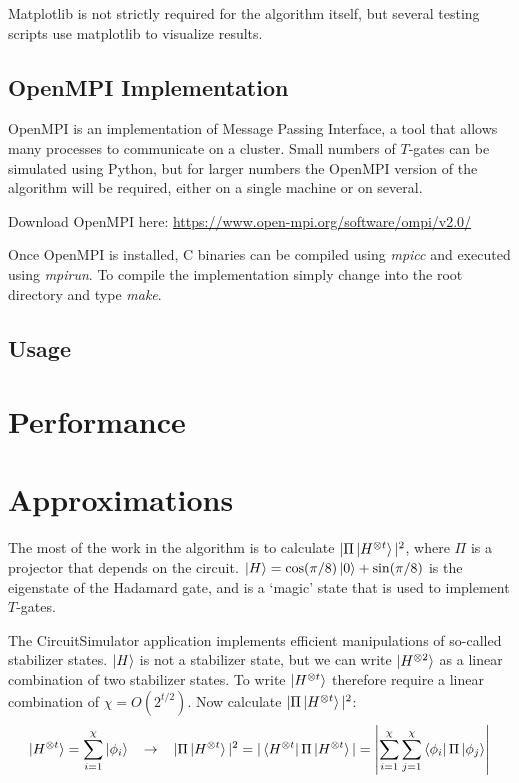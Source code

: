 \documentclass[11pt]{article}
\begin{document}
Matplotlib is not strictly required for the algorithm itself, but several testing scripts use matplotlib to visualize results.

\subsection{OpenMPI Implementation}

OpenMPI is an implementation of Message Passing Interface, a tool that allows many processes to communicate on a cluster. Small numbers of $T$-gates can be simulated using Python, but for larger numbers the OpenMPI version of the algorithm will be required, either on a single machine or on several.

Download OpenMPI here: \url{https://www.open-mpi.org/software/ompi/v2.0/}

\noindent Once OpenMPI is installed, C binaries can be compiled using \textit{mpicc} and executed using \textit{mpirun}. To compile the implementation simply change into the root directory and type \textit{make}.

\subsection{Usage}




\clearpage
\section{Performance}
\section{Approximations}

The most of the work in the algorithm is to calculate $|\Pi\ket{H^{\otimes t}}|^2$, where $\Pi$ is a projector that depends on the circuit. $\ket{H} = \cos(\pi/8)\ket{0} + \sin(\pi/8)$ is the eigenstate of the Hadamard gate, and is a `magic' state that is used to implement $T$-gates.

The CircuitSimulator application implements efficient manipulations of so-called stabilizer states. $\ket{H}$ is not a stabilizer state, but we can write $\ket{H^{\otimes 2}}$ as a linear combination of two stabilizer states. To write $\ket{H^{\otimes t}}$ therefore require a linear combination of $\chi = O(2^{t/2})$. Now calculate $|\Pi\ket{H^{\otimes t}}|^2$:
$$\ket{H^{\otimes t}} = \sum^\chi_{i=1} \ket{\phi_i} \hspace{3mm} \to \hspace{3mm} |\Pi\ket{H^{\otimes t}}|^2 = |\bra{H^{\otimes t}}\Pi\ket{H^{\otimes t}}| =\left| \sum^\chi_{i=1} \sum^\chi_{j=1}\bra{\phi_i}\Pi\ket{\phi_j}\right|$$
\end{document}
